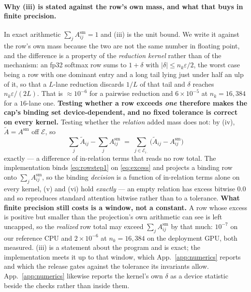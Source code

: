 \documentclass{article}
\begin{document}
\paragraph{Why (iii) is stated against the row's own mass, and what that buys in finite
precision.} In exact arithmetic $\sum_j A^{\mathrm{sm}}_{ij}=1$ and (iii) is the unit bound. We
write it against the row's own mass because the two are not the same number in floating point,
and the difference is a property of the \emph{reduction kernel} rather than of the mechanism: an
fp32 softmax row sums to $1+\delta$ with $|\delta|\le n_k\varepsilon/2$, the worst case being a
row with one dominant entry and a long tail lying just under half an ulp of it, so that a
$L$-lane reduction discards $1/L$ of that tail and $\delta$ reaches $n_k\varepsilon/(2L)$. That is
$\approx10^{-6}$ for a pairwise reduction and $6\times10^{-5}$ at $n_k=16{,}384$ for a $16$-lane
one. \textbf{Testing whether a row exceeds \emph{one} therefore makes the cap's binding set
device-dependent, and no fixed tolerance is correct on every kernel.} Testing whether the
\emph{relation} added mass does not: by (iv), $\tilde A=A^{\mathrm{sm}}$ off $\mathcal{E}$, so
\begin{equation}
\textstyle\sum_j \tilde A_{ij} - \sum_j A^{\mathrm{sm}}_{ij}
\;=\; \sum_{j\in\mathcal{E}_{i\cdot}}\big(\tilde A_{ij}-A^{\mathrm{sm}}_{ij}\big)
\label{eq:excess}
\end{equation}
exactly --- a difference of in-relation terms that reads no row total. The implementation binds
\eqref{eq:rowstep1} on \eqref{eq:excess} and projects a binding row onto $\sum_jA^{\mathrm{sm}}_{ij}$,
so the binding \emph{decision} is a function of in-relation terms alone on every kernel, (v) and
(vi) hold \emph{exactly} --- an empty relation has excess bitwise $0.0$ and so reproduces standard
attention bitwise rather than to a tolerance. \textbf{What finite precision still costs is a
window, not a constant.} A row whose excess is positive but smaller than the projection's own
arithmetic can see is left uncapped, so the \emph{realized} row total may exceed
$\sum_jA^{\mathrm{sm}}_{ij}$ by that much: $10^{-7}$ on our reference CPU and $2\times10^{-6}$ at
$n_k=16{,}384$ on the deployment GPU, both measured. (iii) is a statement about the program and is
exact; the implementation meets it up to that window, which App.~\ref{app:numerics} reports and
which the release gates against the tolerance its invariants allow. App.~\ref{app:numerics}
likewise reports the kernel's own $\delta$ as a device statistic beside the checks rather than
inside them.
\end{document}
